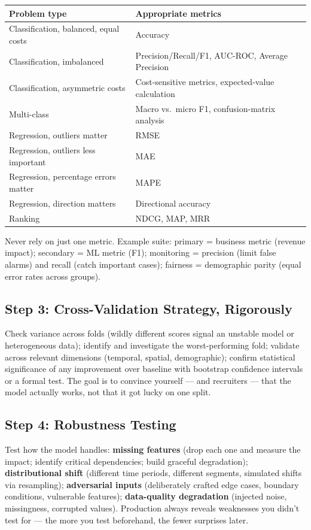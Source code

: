 \begin{longtable}{p{} p{}}
\toprule
\textbf{Problem type} & \textbf{Appropriate metrics} \\
\midrule
\endhead
Classification, balanced, equal costs & Accuracy \\
Classification, imbalanced & Precision/Recall/F1, AUC-ROC, Average Precision \\
Classification, asymmetric costs & Cost-sensitive metrics, expected-value calculation \\
Multi-class & Macro vs.\ micro F1, confusion-matrix analysis \\
Regression, outliers matter & RMSE \\
Regression, outliers less important & MAE \\
Regression, percentage errors matter & MAPE \\
Regression, direction matters & Directional accuracy \\
Ranking & NDCG, MAP, MRR \\
\bottomrule
\end{longtable}

Never rely on just one metric. Example suite: primary = business metric (revenue impact); secondary = ML metric
(F1); monitoring = precision (limit false alarms) and recall (catch important cases); fairness = demographic
parity (equal error rates across groups).

\subsection{Step 3: Cross-Validation Strategy, Rigorously}

Check variance across folds (wildly different scores signal an unstable model or heterogeneous data); identify
and investigate the worst-performing fold; validate across relevant dimensions (temporal, spatial, demographic);
confirm statistical significance of any improvement over baseline with bootstrap confidence intervals or a formal
test. The goal is to convince yourself --- and recruiters --- that the model actually works, not that it got
lucky on one split.

\subsection{Step 4: Robustness Testing}

Test how the model handles: \textbf{missing features} (drop each one and measure the impact; identify critical
dependencies; build graceful degradation); \textbf{distributional shift} (different time periods, different
segments, simulated shifts via resampling); \textbf{adversarial inputs} (deliberately crafted edge cases, boundary
conditions, vulnerable features); \textbf{data-quality degradation} (injected noise, missingness, corrupted
values). Production always reveals weaknesses you didn't test for --- the more you test beforehand, the fewer
surprises later.

